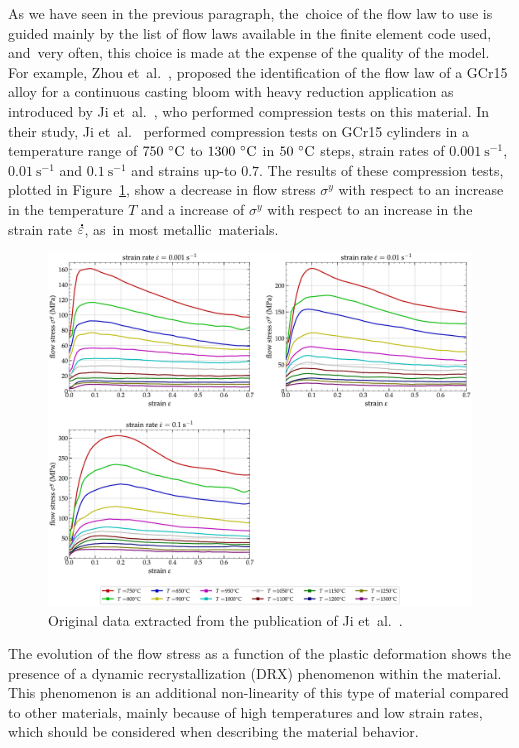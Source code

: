 \documentclass[algorithms,article,accept,pdftex,moreauthors]{Definitions/mdpi}
\DeclareRobustCommand{\mdot}[1]{\accentset{\mbox{\bfseries .}}{#1}}
\DeclareRobustCommand{\ps}{\text{s}^{-1}}
\begin{document}
As we have seen in the previous paragraph, the~choice of the flow law to use is guided mainly by the list of flow laws available in the finite element code used, and~very often, this choice is made at the expense of the quality of the model.
For example, Zhou et~al.~\cite{Zhou-2020}, proposed the identification of the flow law of a GCr15 alloy for a continuous casting bloom with heavy reduction application as introduced by Ji et~al.~\cite{Ji-2018}, who performed compression tests on this material.
In their study, Ji et~al.~\cite{Ji-2018} performed compression tests on GCr15 cylinders in a temperature range of $750~\celsius$ to $1300~\celsius$ in $50~\celsius$ steps, strain rates of $0.001~\ps$,  $0.01~\ps$ and $0.1~\ps$ and strains up-to $0.7$.
The results of these compression tests, plotted in Figure~\ref{fig:Zhou-OriginalData}, show a decrease in flow stress $\sigma^y$ with respect to an increase in the temperature $T$ and a increase of $\sigma^y$ with respect to an increase in the strain rate $\mdot\varepsilon$, as~in most metallic~materials.
\begin{figure}[H]
\includegraphics[width=0.9\columnwidth]{Figures/Zhou-OriginalData}
\caption{Original data extracted from the publication of Ji et~al.~\cite{Ji-2018}.}
\label{fig:Zhou-OriginalData}
\end{figure}
The evolution of the flow stress as a function of the plastic deformation shows the presence of a dynamic recrystallization (DRX) phenomenon within the material.
This phenomenon is an additional non-linearity of this type of material compared to other materials, mainly because of high temperatures and low strain rates, which should be considered when describing the material behavior.
\end{document}
